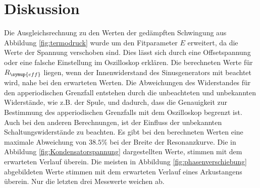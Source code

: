 \section{Diskussion}
\label{sec:Diskussion}
Die Ausgleichsrechnung zu den Werten der gedämpften Schwingung aus Abbildung
\ref{fig:termodruck} wurde um den Fitparameter $E$ erweitert, da die Werte
der Spannung verschoben sind. Dies lässt sich durch eine Offsetspannung oder
eine falsche Einstellung im Oszilloskop erklären.
Die berechneten Werte für $R_{\symup{eff}}$ liegen, wenn der Innenwiderstand des
Sinusgenerators mit beachtet wird, nahe bei den erwarteten Werten. Die
Abweichungen des Widerstandes für den apperiodischen Grenzfall entstehen
 durch die unbeachteten und unbekannten Widerstände, wie z.B.
der Spule, und dadurch, dass die Genauigkeit zur Bestimmung des apperiodischen
Grenzfalls mit dem Oszilloskop begrenzt ist.
Auch bei den anderen Berechnungen, ist der Einfluss der unbekannten
Schaltungswiderstände zu beachten. Es gibt bei den berechneten Werten
eine maximale Abweichung von $38.5\%$ bei der Breite der Resonanzkurve.
Die in Abbildung \ref{fig:Kondensatorspannung} dargestellten Werte,
stimmen mit dem erwarteten Verlauf überein.
Die meisten in Abbildung \ref{fig:phasenverschiebung} abgebildeten Werte stimmen mit dem
erwarteten Verlauf eines Arkustangens überein. Nur die letzten drei Messwerte
weichen ab.
